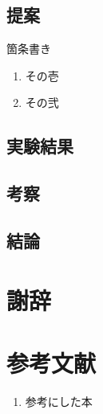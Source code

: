 \documentclass[11pt]{jsarticle}
\begin{document}
\subsection{提案}
箇条書き
\begin{enumerate}
	\item その壱
	\item その弐
\end{enumerate}

\subsection{実験結果}
\subsection{考察}
\subsection{結論}
\section*{謝辞}
\section*{参考文献}

\renewcommand{\labelenumi}{[\arabic{enumi}]}
\begin{enumerate}
	\item 参考にした本
\end{enumerate}
\end{document}
